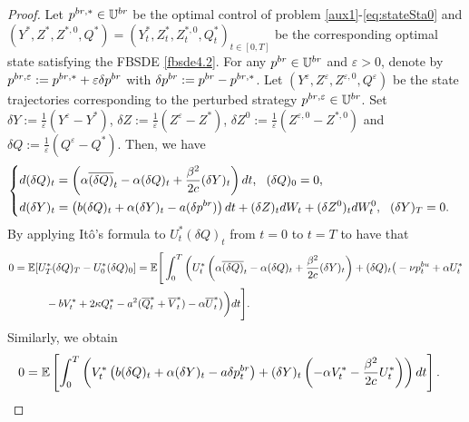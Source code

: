\documentclass[10pt,a4paper]{amsart}
\begin{document}
\begin{proof}	
Let $p^{{\rm br},*}\in\mathbb{U}^{\rm br}$ be the optimal control of problem \eqref{aux1}-\eqref{eq:stateSta0} and $(Y^*, Z^*,Z^{*,0},Q^*)=(Y_t^*, Z_t^*,Z_t^{*,0}, Q_t^*)_{t\in [0, T]}$ be the corresponding optimal state satisfying the FBSDE \eqref{fbsde4.2}. For any $p^{{\rm br}}\in\mathbb{U}^{\rm br}$ and $\varepsilon>0$, denote by $p^{{\rm br}, \varepsilon}:=p^{{\rm br},*}+\varepsilon \delta p^{{\rm br}}$ with $\delta p^{{\rm br}}:=p^{{\rm br}}-p^{{\rm br},*}$. Let $( Y^{\varepsilon}, Z^{\varepsilon},Z^{\varepsilon,0},Q^{\varepsilon})$ be the state trajectories corresponding to the perturbed strategy $p^{{\rm br}, \varepsilon}\in\mathbb{U}^{\rm br}$. Set $\delta Y:=\frac{1}{\varepsilon}(Y^{\varepsilon}-Y^*)$, $\delta Z:=\frac{1}{\varepsilon}(Z^{\varepsilon}-Z^*)$, $\delta Z^0:=\frac{1}{\varepsilon}(Z^{\varepsilon,0}-Z^{*,0})$ and $\delta Q:=\frac{1}{\varepsilon}(Q^{\varepsilon}-Q^*)$. Then, we have 
\begin{align*}
\begin{cases}
\displaystyle d(\delta Q)_t=\left(\alpha \overline{(\delta Q)}_t-\alpha(\delta Q)_t+\frac{\beta^2}{2c}(\delta Y)_t\right)dt,~~(\delta Q)_0=0,\\[0.8em]
\displaystyle d(\delta Y)_t=\left(b(\delta Q)_t+\alpha (\delta Y)_t-a(\delta p^{{\rm br}})\right)dt+(\delta Z)_tdW_t+(\delta Z^0)_tdW_t^0,~~(\delta Y)_T=0.\\
\end{cases}
\end{align*}
By applying It\^o's formula to $U_t^*(\delta Q)_t$ from $t=0$ to $t=T$ to have that
\begin{align}\label{ito1}
0&=\mathbb{E}[U_T^*(\delta Q)_T-U_0^*(\delta Q)_0]=\mathbb{E}\Bigg[\int_0^T\bigg(U_t^*\left(\alpha \overline{(\delta Q)}_t-\alpha (\delta Q)_t+\frac{\beta^2}{2c}(\delta Y)_t\right)+(\delta Q)_t\big(-\nu p_t^{{\rm bu}}+\alpha U_t^*\nonumber\\
&\qquad\quad-bV_t^*+2\kappa Q_t^*-a^2(\overline{Q}_t^*+\overline{V}_t^*)-\alpha \overline{U}_t^*\big)\bigg)dt\Bigg].
\end{align}
Similarly, we obtain
\begin{align}\label{ito2}
0%
&=\mathbb{E}\left[\int_0^T\left(V_t^*\left(b(\delta Q)_t+\alpha (\delta Y)_t-a\delta p_t^{{\rm br}}\right)+(\delta Y)_t\left(-\alpha V_t^*-\frac{\beta^2}{2c} U_t^*\right)\right)dt\right].
\end{align}

\end{proof}
\end{document}
